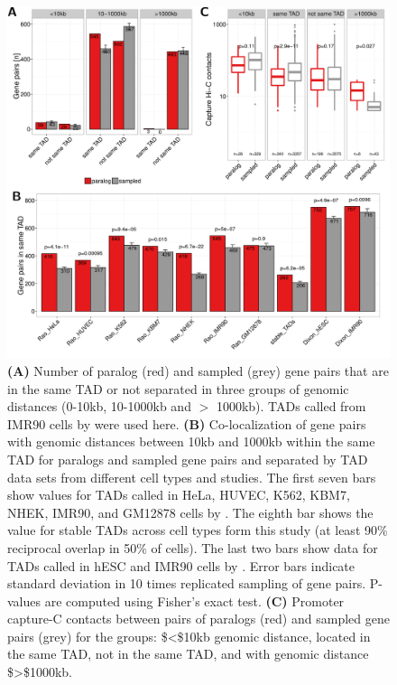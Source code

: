 \documentclass[a4paper,twoside=true,openright,parskip=full,chapterprefix=true,11pt,headings=normal,bibliography=totoc,listof=totoc,titlepage=on,captions=tableabove,draft=false]{scrreprt}
\theoremstyle{definition}
\theoremstyle{definition}
\theoremstyle{definition}
\theoremstyle{remark}
\begin{document}
\begin{figure}

{\centering \includegraphics[width=0.8\linewidth]{figures/paralog/SI/figS9} 

}

\caption{\textbf{(A)} Number of paralog (red) and sampled
(grey) gene pairs that are in the same TAD or not separated in three
groups of genomic distances (0-10kb, 10-1000kb and \(>\) 1000kb). TADs
called from IMR90 cells by \citep{Rao2014} were used here. \textbf{(B)}
Co-localization of gene pairs with genomic distances between 10kb and
1000kb within the same TAD for paralogs and sampled gene pairs and
separated by TAD data sets from different cell types and studies. The
first seven bars show values for TADs called in HeLa, HUVEC, K562, KBM7,
NHEK, IMR90, and GM12878 cells by \citep{Rao2014}. The eighth bar shows
the value for stable TADs across cell types form this study (at least
90\% reciprocal overlap in 50\% of cells). The last two bars show data
for TADs called in hESC and IMR90 cells by \citep{Dixon2012}. Error bars
indicate standard deviation in 10 times replicated sampling of gene
pairs. P-values are computed using Fisher's exact test. \textbf{(C)}
Promoter capture-C contacts between pairs of paralogs (red) and sampled
gene pairs (grey) for the groups: \$\textless{}\$10kb genomic distance,
located in the same TAD, not in the same TAD, and with genomic distance
\$\textgreater{}\$1000kb.}\label{fig:closePairsInTAD}
\end{figure}
\end{document}
